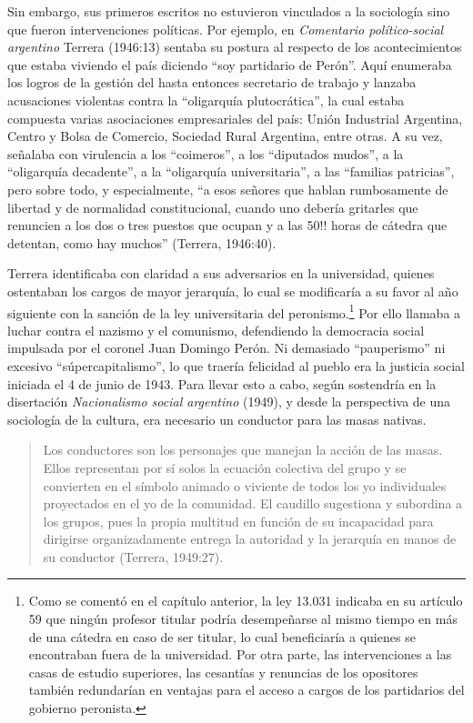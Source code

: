Sin embargo, sus primeros escritos no estuvieron vinculados a la sociología sino que fueron intervenciones políticas. Por ejemplo, en \emph{Comentario político-social argentino} Terrera (1946:13) sentaba su postura al respecto de los acontecimientos que estaba viviendo el país diciendo ``soy partidario de Perón''. Aquí enumeraba los logros de la gestión del hasta entonces secretario de trabajo y lanzaba acusaciones violentas contra la ``oligarquía plutocrática'', la cual estaba compuesta varias asociaciones empresariales del país: Unión Industrial Argentina, Centro y Bolsa de Comercio, Sociedad Rural Argentina, entre otras. A su vez, señalaba con virulencia a los ``coimeros'', a los ``diputados mudos'', a la ``oligarquía decadente'', a la ``oligarquía universitaria'', a las ``familias patricias'', pero sobre todo, y especialmente, ``a esos señores que hablan rumbosamente de libertad y de normalidad constitucional, cuando uno debería gritarles que renuncien a los dos o tres puestos que ocupan y a las 50!! horas de cátedra que detentan, como hay muchos'' (Terrera, 1946:40).

Terrera identificaba con claridad a sus adversarios en la universidad, quienes ostentaban los cargos de mayor jerarquía, lo cual se modificaría a su favor al año siguiente con la sanción de la ley universitaria del peronismo.\footnote{Como se comentó en el capítulo anterior, la ley 13.031 indicaba en su artículo 59 que ningún profesor titular podría desempeñarse al mismo tiempo en más de una cátedra en caso de ser titular, lo cual beneficiaría a quienes se encontraban fuera de la universidad. Por otra parte, las intervenciones a las casas de estudio superiores, las cesantías y renuncias de los opositores también redundarían en ventajas para el acceso a cargos de los partidarios del gobierno peronista.} Por ello llamaba a luchar contra el nazismo y el comunismo, defendiendo la democracia social impulsada por el coronel Juan Domingo Perón. Ni demasiado ``pauperismo'' ni excesivo ``súpercapitalismo'', lo que traería felicidad al pueblo era la justicia social iniciada el 4 de junio de 1943. Para llevar esto a cabo, según sostendría en la disertación \emph{Nacionalismo social argentino} (1949), y desde la perspectiva de una sociología de la cultura, era necesario un conductor para las masas nativas.

\begin{quote}
Los conductores son los personajes que manejan la acción de las masas. Ellos representan por sí solos la ecuación colectiva del grupo y se convierten en el símbolo animado o viviente de todos los yo individuales proyectados en el yo de la comunidad. El caudillo sugestiona y subordina a los grupos, pues la propia multitud en función de su incapacidad para dirigirse organizadamente entrega la autoridad y la jerarquía en manos de su conductor (Terrera, 1949:27).
\end{quote}

